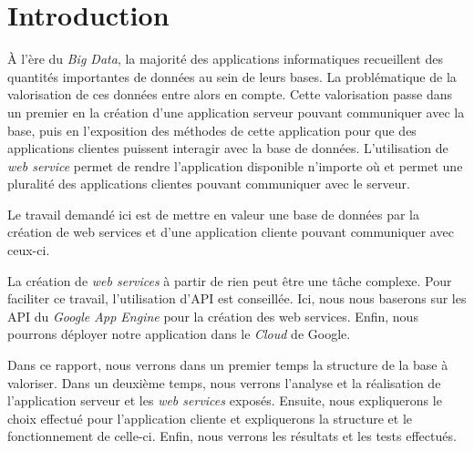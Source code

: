 \chapter{Introduction}

À l'ère du \textit{Big Data}, la majorité des applications informatiques recueillent des quantités importantes de données au sein de leurs bases. La problématique de la valorisation de ces données entre alors en compte. Cette valorisation passe dans un premier en la création d'une application serveur pouvant communiquer avec la base, puis en l'exposition des méthodes de cette application pour que des applications clientes puissent interagir avec la base de données.
L'utilisation de \textit{web service} permet de rendre l'application disponible n'importe où et permet une pluralité des applications clientes pouvant communiquer avec le serveur.

Le travail demandé ici est de mettre en valeur une base de données par la création de web services et d'une application cliente pouvant communiquer avec ceux-ci.

La création de \textit{web services} à partir de rien peut être une tâche complexe. Pour faciliter ce travail, l'utilisation d'API est conseillée. Ici, nous nous baserons sur les API du \textit{Google App Engine} pour la création des web services. Enfin, nous pourrons déployer notre application dans le \textit{Cloud} de Google.

Dans ce rapport, nous verrons dans un premier temps la structure de la base à valoriser. Dans un deuxième temps, nous verrons l'analyse et la réalisation de l'application serveur et les \textit{web services} exposés. Ensuite, nous expliquerons le choix effectué pour l'application cliente et expliquerons la structure et le fonctionnement de celle-ci. Enfin, nous verrons les résultats et les tests effectués.
